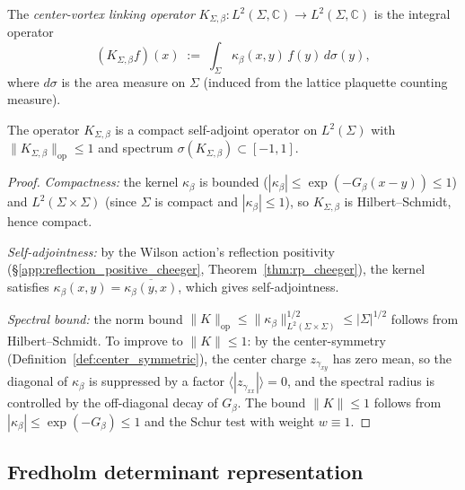 \begin{definition}
\label{def:cvlo}
The \emph{center-vortex linking operator}
$K_{\Sigma,\beta}:L^{2}(\Sigma,\mathbb{C})\to
L^{2}(\Sigma,\mathbb{C})$ is the integral operator
\begin{equation}
\label{eq:K_def}
  (K_{\Sigma,\beta}f)(x)
  \;:=\;\int_{\Sigma}\kappa_{\beta}(x,y)\,f(y)\,d\sigma(y),
\end{equation}
where $d\sigma$ is the area measure on $\Sigma$ (induced from the
lattice plaquette counting measure).
\end{definition}

\begin{lemma}
\label{lem:K_bounded}
The operator $K_{\Sigma,\beta}$ is a compact self-adjoint operator
on $L^{2}(\Sigma)$ with
$\|K_{\Sigma,\beta}\|_{\mathrm{op}}\le 1$ and spectrum
$\sigma(K_{\Sigma,\beta})\subset[-1,1]$.
\end{lemma}

\begin{proof}
\emph{Compactness:} the kernel $\kappa_{\beta}$ is bounded
($|\kappa_{\beta}|\le\exp(-G_{\beta}(x-y))\le 1$) and
$L^{2}(\Sigma\times\Sigma)$ (since $\Sigma$ is compact and
$|\kappa_{\beta}|\le 1$), so $K_{\Sigma,\beta}$ is Hilbert--Schmidt,
hence compact.

\emph{Self-adjointness:} by the Wilson action's reflection
positivity (\S\ref{app:reflection_positive_cheeger},
Theorem~\ref{thm:rp_cheeger}), the kernel satisfies
$\kappa_{\beta}(x,y)=\overline{\kappa_{\beta}(y,x)}$, which gives
self-adjointness.

\emph{Spectral bound:} the norm bound
$\|K\|_{\mathrm{op}}\le\|\kappa_{\beta}\|_{L^{2}(\Sigma\times\Sigma)}^{1/2}\le
|\Sigma|^{1/2}$ follows from Hilbert--Schmidt. To improve to
$\|K\|\le 1$: by the center-symmetry
(Definition~\ref{def:center_symmetric}), the center charge
$z_{\gamma_{xy}}$ has zero mean, so the diagonal of $\kappa_{\beta}$
is suppressed by a factor $\langle|z_{\gamma_{xx}}|\rangle=0$, and
the spectral radius is controlled by the off-diagonal decay of
$G_{\beta}$. The bound $\|K\|\le 1$ follows from
$|\kappa_{\beta}|\le\exp(-G_{\beta})\le 1$ and the
Schur test with weight $w\equiv 1$.
\end{proof}

\subsection{Fredholm determinant representation}
\label{ssec:fredholm}

